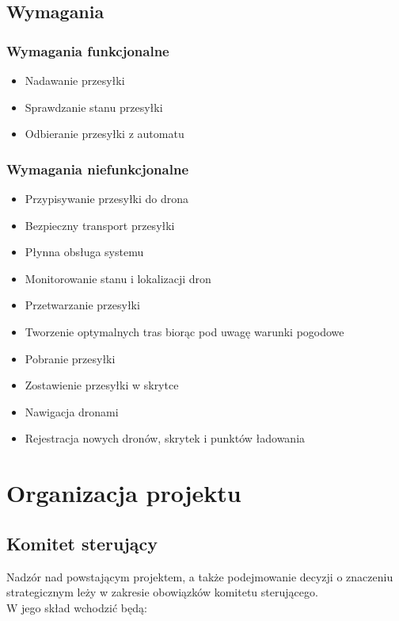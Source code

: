 \documentclass[12pt]{article}
\begin{document}
\subsection{Wymagania}
\subsubsection{Wymagania funkcjonalne}
\begin{itemize}
\item Nadawanie przesyłki
\item Sprawdzanie stanu przesyłki
\item Odbieranie przesyłki z automatu
\end{itemize}
\subsubsection{Wymagania niefunkcjonalne}
\begin{itemize}
\item Przypisywanie przesyłki do drona
\item Bezpieczny transport przesyłki
\item Płynna obsługa systemu
\item Monitorowanie stanu i lokalizacji dron
\item Przetwarzanie przesyłki
\item Tworzenie optymalnych tras biorąc pod uwagę warunki pogodowe
\item Pobranie przesyłki
\item Zostawienie przesyłki w skrytce
\item Nawigacja dronami
\item Rejestracja nowych dronów, skrytek i punktów ładowania
\end{itemize}

\newpage
\section{Organizacja projektu}
\subsection{Komitet sterujący}
Nadzór nad powstającym projektem, a także podejmowanie decyzji o znaczeniu strategicznym leży w zakresie obowiązków komitetu sterującego.\\
W jego skład wchodzić będą:\\
\end{document}
